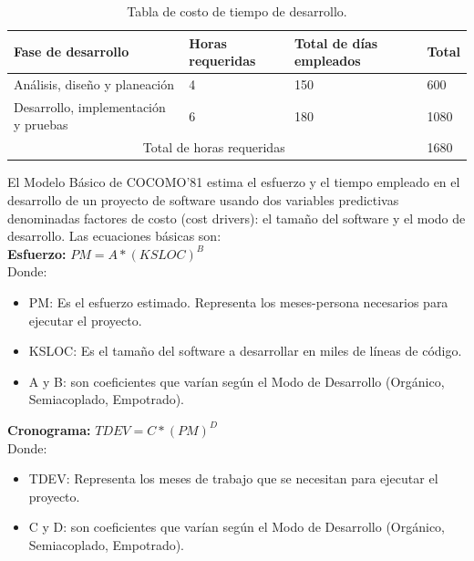 	\begin{table}[htbp]
		\begin{center}
			\begin{tabular}{|p{20mm}|p{30mm}|p{15mm}|p{15mm}|}
				\hline
				\textbf{Fase de desarrollo}  & \textbf{Horas requeridas} & \textbf{Total de días empleados} & \textbf{Total} \\ \hline 
				Análisis, diseño y planeación & 4 & 150 & 600 \\ \hline
				
				Desarrollo, implementación y pruebas & 6 & 180 & 1080 \\ \hline
				
				\multicolumn{3}{|c|}{Total de horas requeridas} & 1680\\ \hline
			\end{tabular}
			\caption{Tabla de costo de tiempo de desarrollo.}
			\label{tablacostodesarrollo}
		\end{center}
	\end{table}
	\newpage
	
	\noindent El Modelo Básico de COCOMO’81 estima el esfuerzo y el tiempo empleado en el desarrollo
	de un proyecto de software usando dos variables predictivas denominadas factores de costo (cost
	drivers): el tamaño del software y el modo de desarrollo. Las ecuaciones básicas son: \\
	\textbf{Esfuerzo:}
	$PM = A * (KSLOC)^{B} $\\
	
	\noindent Donde: 
	\begin{itemize}
		\item PM: Es el esfuerzo estimado. Representa los meses-persona necesarios para ejecutar el proyecto.
		\item KSLOC: Es el tamaño del software a desarrollar en miles de líneas de código.
		\item A y B: son coeficientes que varían según el Modo de Desarrollo (Orgánico, Semiacoplado, Empotrado).
	\end{itemize}
	
	\textbf{Cronograma:}
	$TDEV = C * (PM)^{D} $\\
	\noindent Donde: 
	\begin{itemize}
		\item TDEV: Representa los meses de trabajo que se necesitan para ejecutar el proyecto.
		\item C y D: son coeficientes que varían según el Modo de Desarrollo (Orgánico, Semiacoplado, Empotrado).
	\end{itemize}
	
